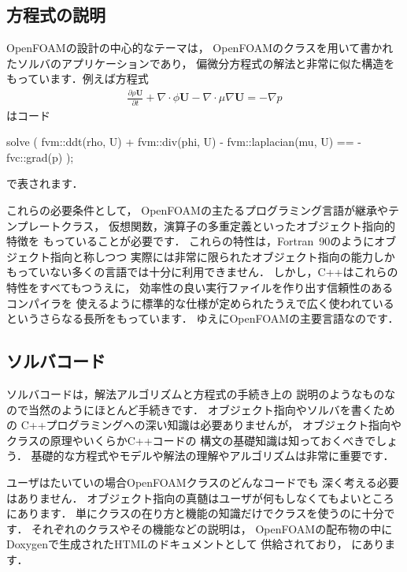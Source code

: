\subsection{方程式の説明}
\label{ssec:3.1.3}
OpenFOAMの設計の中心的なテーマは，
OpenFOAMのクラスを用いて書かれたソルバのアプリケーションであり，
偏微分方程式の解法と非常に似た構造をもっています．例えば方程式
\begin{align*}
 \frac{\partial\rho\bm{U}}{\partial t} + \nabla \cdot \phi\bm{U}
 - \nabla \cdot \mu\nabla\bm{U} = -\nabla p
\end{align*}
はコード
\begin{OFverbatim}[file]
solve
(
    fvm::ddt(rho, U)
  + fvm::div(phi, U)
  - fvm::laplacian(mu, U)
    ==
  - fvc::grad(p)
);
\end{OFverbatim}
で表されます．

これらの必要条件として，
OpenFOAMの主たるプログラミング言語が継承やテンプレートクラス，
仮想関数，演算子の多重定義といったオブジェクト指向的特徴を
もっていることが必要です．
これらの特性は，Fortran~90のようにオブジェクト指向と称しつつ
実際には非常に限られたオブジェクト指向の能力しか
もっていない多くの言語では十分に利用できません．
しかし，C++はこれらの特性をすべてもつうえに，
効率性の良い実行ファイルを作り出す信頼性のあるコンパイラを
使えるように標準的な仕様が定められたうえで広く使われている
というさらなる長所をもっています．
ゆえにOpenFOAMの主要言語なのです．


\subsection{ソルバコード}
\label{ssec:3.1.4}
ソルバコードは，解法アルゴリズムと方程式の手続き上の
説明のようなものなので当然のようにほとんど手続きです．
オブジェクト指向やソルバを書くための
C++プログラミングへの深い知識は必要ありませんが，
オブジェクト指向やクラスの原理やいくらかC++コードの
構文の基礎知識は知っておくべきでしょう．
基礎的な方程式やモデルや解法の理解やアルゴリズムは非常に重要です．

ユーザはたいていの場合OpenFOAMクラスのどんなコードでも
深く考える必要はありません．
オブジェクト指向の真髄はユーザが何もしなくてもよいところにあります．
単にクラスの在り方と機能の知識だけでクラスを使うのに十分です．
それぞれのクラスやその機能などの説明は，
OpenFOAMの配布物の中にDoxygenで生成されたHTMLのドキュメントとして
供給されており，
にあります．



